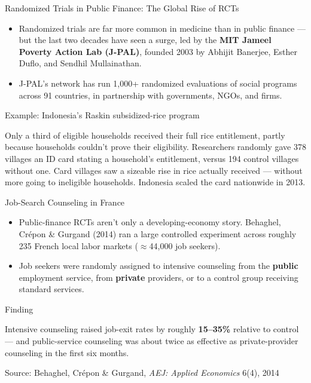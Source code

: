 \documentclass[11pt,aspectratio=169]{beamer}
\newcommand{\srcnote}[1]{{\footnotesize\color{wugray}Source: #1}}
\begin{document}
\begin{frame}{Randomized Trials in Public Finance: The Global Rise of RCTs}
 
  \begin{itemize}
    \item Randomized trials are far more common in medicine than in public finance --- but the last two decades have seen a surge, led by the \textbf{MIT Jameel Poverty Action Lab (J-PAL)}, founded 2003 by Abhijit Banerjee, Esther Duflo, and Sendhil Mullainathan.
    \item J-PAL's network has run 1,000+ randomized evaluations of social programs across 91 countries, in partnership with governments, NGOs, and firms.
  \end{itemize}
  \begin{alertblock}{Example: Indonesia's Raskin subsidized-rice program}
  \end{alertblock}
   Only a third of eligible households received their full rice entitlement, partly because households couldn't prove their eligibility. Researchers randomly gave 378 villages an ID card stating a household's entitlement, versus 194 control villages without one. Card villages saw a sizeable rise in rice actually received --- without more going to ineligible households. Indonesia scaled the card nationwide in 2013.

\end{frame}

\begin{frame}{ Job-Search Counseling in France}
  
  \begin{itemize}
    \item Public-finance RCTs aren't only a developing-economy story. Behaghel, Crépon \& Gurgand (2014) ran a large controlled experiment across roughly 235 French local labor markets (\(\approx\)44{,}000 job seekers).
    \item Job seekers were randomly assigned to intensive counseling from the \textbf{public} employment service, from \textbf{private} providers, or to a control group receiving standard services.
  \end{itemize}
  \begin{alertblock}{Finding}
  \end{alertblock}
    Intensive counseling raised job-exit rates by roughly \textbf{15--35\%} relative to control --- and public-service counseling was about twice as effective as private-provider counseling in the first six months.
    
  \srcnote{Behaghel, Crépon \& Gurgand, \emph{AEJ: Applied Economics} 6(4), 2014}
\end{frame}
\end{document}
